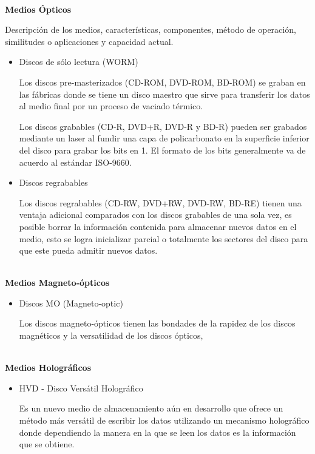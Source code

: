 \textbf{\\ Medios \'{O}pticos \\}

Descripci\'{o}n de los medios, caracter\'{i}sticas, componentes, m\'{e}todo de operaci\'{o}n, similitudes o aplicaciones y capacidad actual.

\begin{itemize}
  \item Discos de s\'{o}lo lectura (WORM)
  
  Los discos pre-masterizados (CD-ROM, DVD-ROM, BD-ROM) se graban en las f\'{a}bricas donde se tiene un disco maestro que sirve para transferir los datos al medio final por un proceso de vaciado t\'{e}rmico.
  
  Los discos grabables (CD-R, DVD+R, DVD-R y BD-R) pueden ser grabados mediante un laser al fundir una capa de policarbonato en la superficie inferior del disco para grabar los bits en 1. El formato de los bits generalmente va de acuerdo al est\'{a}ndar ISO-9660.
  
  \item Discos regrabables
  
  Los discos regrabables (CD-RW, DVD+RW, DVD-RW, BD-RE) tienen una ventaja adicional comparados con los discos grabables de una sola vez, es posible borrar la informaci\'{o}n contenida para almacenar nuevos datos en el medio, esto se logra inicializar parcial o totalmente los sectores del disco para que este pueda admitir nuevos datos.
  
\end{itemize}

\textbf{\\ Medios Magneto-\'{o}pticos \\}

\begin{itemize}
  \item Discos MO (Magneto-optic)
  
  Los discos magneto-\'{o}pticos tienen las bondades de la rapidez de los discos magn\'{e}ticos y la versatilidad de los discos \'{o}pticos, 
  
\end{itemize}

\textbf{\\ Medios Hologr\'{a}ficos \\}

\begin{itemize}
  \item HVD - Disco Vers\'{a}til Hologr\'{a}fico
  
  Es un nuevo medio de almacenamiento a\'{u}n en desarrollo que ofrece un m\'{e}todo m\'{a}s vers\'{a}til de escribir los datos utilizando un mecanismo hologr\'{a}fico donde dependiendo la manera en la que se leen los datos es la informaci\'{o}n que se obtiene.
  
\end{itemize}
